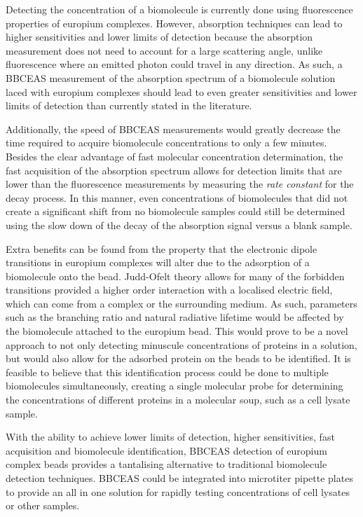 Detecting the concentration of a biomolecule is currently done using
fluorescence properties of europium complexes. However, absorption techniques
can lead to higher sensitivities and lower limits of detection because the
absorption measurement does not need to account for a large scattering
angle, unlike fluorescence where an emitted photon could travel in any
direction. As such, a \ac{BBCEAS} measurement of the
absorption spectrum of a biomolecule solution laced with europium complexes
should lead to even greater sensitivities and lower limits of detection than
currently stated in the literature.

Additionally, the speed of \ac{BBCEAS} measurements would greatly decrease the
time required to acquire biomolecule concentrations to only a few minutes.
Besides the clear advantage of fast molecular concentration determination, the
fast acquisition of the absorption spectrum allows for detection limits that
are lower than the fluorescence measurements by measuring the \emph{rate
constant} for the decay process. In this manner, even concentrations of
biomolecules that did not create a significant shift from no biomolecule
samples could still be determined using the slow down of the decay of the
absorption signal versus a blank sample.

Extra benefits can be found from the property that the electronic dipole
transitions in europium complexes will alter due to the adsorption of a
biomolecule onto the bead. Judd-Ofelt theory allows for many of the forbidden
transitions provided a higher order interaction with a localised electric
field, which can come from a complex or the surrounding medium. As such,
parameters such as the branching ratio and natural radiative lifetime would be
affected by the biomolecule attached to the europium bead. This would prove to
be a novel approach to not only detecting minuscule concentrations of proteins
in a solution, but would also allow for the adsorbed protein on the beads to
be identified. It is feasible to believe that this identification process
could be done to multiple biomolecules simultaneously, creating a single
molecular probe for determining the concentrations of different proteins in a
molecular soup, such as a cell lysate sample.

With the ability to achieve lower limits of detection, higher sensitivities,
fast acquisition and biomolecule identification, \ac{BBCEAS} detection of
europium complex beads provides a tantalising alternative to traditional
biomolecule detection techniques. \ac{BBCEAS} could be integrated into
microtiter pipette plates to provide an all in one solution for rapidly
testing concentrations of cell lysates or other samples.



